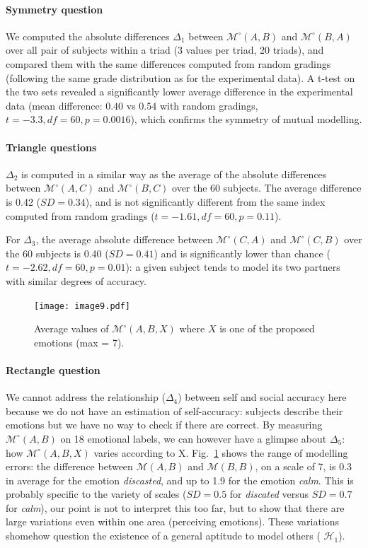 \documentclass[natbib]{svjour3}
\newcommand{\gmodel}[2]{{$\mathcal{M}(#1, #2)$}}
\newcommand{\Model}[3]{{$\mathcal{M}^{\circ}(#1, #2, #3)$}}
\newcommand{\gModel}[2]{{$\mathcal{M}^{\circ}(#1, #2)$}}
\begin{document}
\paragraph{Symmetry question} We computed the absolute differences $\Delta_1$
between \gModel{A}{B} and \gModel{B}{A} over all pair of subjects within a triad
(3 values per triad, 20 triads), and compared them with the same differences
computed from random gradings (following the same grade distribution as for the
experimental data). A t-test on the two sets revealed a significantly lower average difference in
the experimental data (mean difference: $0.40$ vs $0.54$ with random gradings,
$t=-3.3, df=60, p = 0.0016$), which confirms the symmetry of mutual modelling.

\paragraph{Triangle questions} $\Delta_2$ is computed in a similar way as the average of
the absolute differences between \gModel{A}{C} and \gModel{B}{C} over the 60
subjects. The average difference is 0.42 ($SD= 0.34$), and is not significantly
different from the same index computed from random gradings ($t=-1.61, df=60,
p=0.11$).

For $\Delta_3$, the average absolute difference between \gModel{C}{A} and
\gModel{C}{B} over the 60 subjects is 0.40 ($SD= 0.41$) and is significantly
lower than chance ($t=-2.62, df=60, p=0.01$): a given subject tends to model its
two partners with similar degrees of accuracy.

\begin{figure}[ht!]
        \centering
        \texttt{[image: image9.pdf]}
        \caption{Average values of \Model{A}{B}{X} where $X$ is one of the proposed
        emotions (max = 7).}
        \label{study3:deg_m_values}
\end{figure}


\paragraph{Rectangle question} We cannot address the relationship ($\Delta_4$)
between self and social accuracy here because we do not have an estimation of
self-accuracy: subjects describe their emotions but we have no way to check if
there are correct. By measuring \gModel{A}{B} on  18 emotional labels,
we can however have a glimpse about $\Delta_5$: how \Model{A}{B}{X} varies
according to X.  Fig.~\ref{study3:deg_m_values} shows the range of modelling
errors: the difference between \gmodel{A}{B} and \gmodel{B}{B}, on a scale of 7,
is 0.3 in average for the emotion \emph{discasted}, and up to 1.9 for the
emotion \emph{calm}. This is probably specific to the variety of scales  ($SD=
0.5$ for \emph{discated} versus $SD=0.7$ for \emph{calm}), our point is not to
interpret this too far, but to show that there are large variations even within one
area  (perceiving emotions). These variations shomehow question the existence of a general aptitude to model others ( $\mathcal{H}_{1}$).
\end{document}
